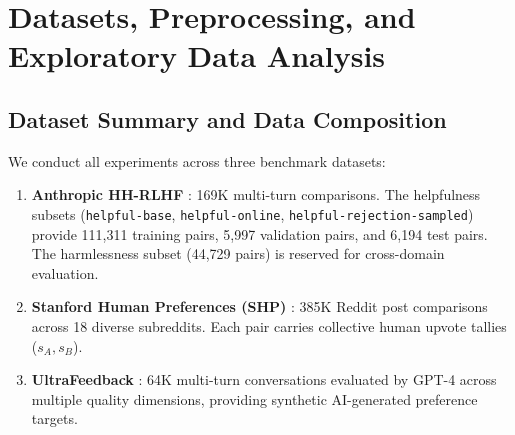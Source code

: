 \documentclass[12pt,a4paper]{article}
\begin{document}
\section{Datasets, Preprocessing, and Exploratory Data Analysis}

\subsection{Dataset Summary and Data Composition}
We conduct all experiments across three benchmark datasets:
\begin{enumerate}
    \item \textbf{Anthropic HH-RLHF} \citep{bai2022training}: 169K multi-turn comparisons. The helpfulness subsets (\texttt{helpful-base}, \texttt{helpful-online}, \texttt{helpful-rejection-sampled}) provide 111,311 training pairs, 5,997 validation pairs, and 6,194 test pairs. The harmlessness subset (44,729 pairs) is reserved for cross-domain evaluation.
    \item \textbf{Stanford Human Preferences (SHP)} \citep{ethayarajh2022understanding}: 385K Reddit post comparisons across 18 diverse subreddits. Each pair carries collective human upvote tallies ($s_A, s_B$).
    \item \textbf{UltraFeedback} \citep{cui2024ultrafeedback}: 64K multi-turn conversations evaluated by GPT-4 across multiple quality dimensions, providing synthetic AI-generated preference targets.
\end{enumerate}
\end{document}
